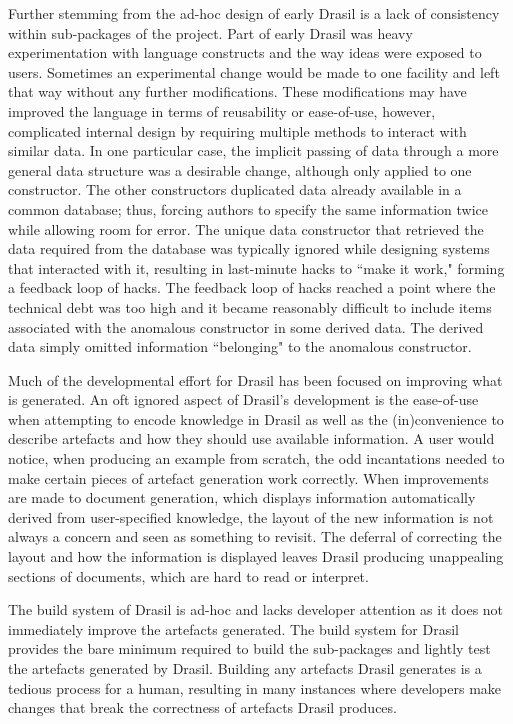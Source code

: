 Further stemming from the ad-hoc design of early Drasil is a lack of consistency within sub-packages of the project. Part of early Drasil was heavy experimentation with language constructs and the way ideas were exposed to users. Sometimes an experimental change would be made to one facility and left that way without any further modifications. These modifications may have improved the language in terms of reusability or ease-of-use, however, complicated internal design by requiring multiple methods to interact with similar data. In one particular case, the implicit passing of data through a more general data structure was a desirable change, although only applied to one constructor. The other constructors duplicated data already available in a common database; thus, forcing authors to specify the same information twice while allowing room for error. The unique data constructor that retrieved the data required from the database was typically ignored while designing systems that interacted with it, resulting in last-minute hacks to ``make it work," forming a feedback loop of hacks. The feedback loop of hacks reached a point where the technical debt was too high and it became reasonably difficult to include items associated with the anomalous constructor in some derived data. The derived data simply omitted information ``belonging" to the anomalous constructor.

Much of the developmental effort for Drasil has been focused on improving what is generated. An oft ignored aspect of Drasil's development is the ease-of-use when attempting to encode knowledge in Drasil as well as the (in)convenience to describe artefacts and how they should use available information. A user would notice, when producing an example from scratch, the odd incantations needed to make certain pieces of artefact generation work correctly. When improvements are made to document generation, which displays information automatically derived from user-specified knowledge, the layout of the new information is not always a concern and seen as something to revisit. The deferral of correcting the layout and how the information is displayed leaves Drasil producing unappealing sections of documents, which are hard to read or interpret.

The build system of Drasil is ad-hoc and lacks developer attention as it does not immediately improve the artefacts generated. The build system for Drasil provides the bare minimum required to build the sub-packages and lightly test the artefacts generated by Drasil. Building any artefacts Drasil generates is a tedious process for a human, resulting in many instances where developers make changes that break the correctness of artefacts Drasil produces.

